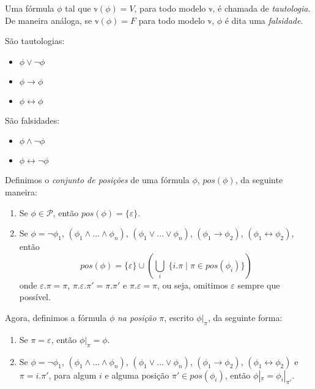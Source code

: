 \begin{definition}
    Uma fórmula $\phi$ tal que $\mathbb{v}(\phi) = V$, para todo modelo $\mathbb{v}$, é chamada de \emph{tautologia}. De maneira análoga, se $\mathbb{v}(\phi) = F$ para todo modelo $\mathbb{v}$, $\phi$ é dita uma \emph{falsidade}.
\end{definition}

\begin{example}
    São tautologias:
    \begin{itemize}
        \item $\phi \vee \neg \phi$
        \item $\phi \rightarrow \phi$
        \item $\phi \leftrightarrow \phi$
    \end{itemize}
    São falsidades:
    \begin{itemize}
        \item $\phi \wedge \neg \phi$
        \item $\phi \leftrightarrow \neg \phi$
    \end{itemize}
\end{example}

\begin{definition}
    Definimos o \emph{conjunto de posições} de uma fórmula $\phi$, $pos(\phi)$, da seguinte maneira:
    \begin{enumerate}
        \item Se $\phi \in \mathcal{P}$, então $pos(\phi) = \{\varepsilon\}$.
        \item Se $\phi = \neg \phi_1$, $(\phi_1 \wedge ... \wedge \phi_n)$, $(\phi_1 \vee ... \vee \phi_n)$, $(\phi_1 \rightarrow \phi_2)$, $(\phi_1 \leftrightarrow \phi_2)$, então $$pos(\phi) = \{\varepsilon\} \cup \left(\bigcup_i \; \{i.\pi \mid \pi \in pos(\phi_i)\}\right)$$ onde $\varepsilon.\pi = \pi$, $\pi.\varepsilon.\pi' = \pi.\pi'$ e $\pi.\varepsilon = \pi$, ou seja, omitimos $\varepsilon$ sempre que possível.
    \end{enumerate}
    Agora, definimos a fórmula $\phi$ \emph{na posição} $\pi$, escrito $\phi|_\pi$, da seguinte forma:
    \begin{enumerate}
        \item Se $\pi = \varepsilon$, então $\phi|_\pi = \phi$.
        \item Se $\phi = \neg \phi_1$, $(\phi_1 \wedge ... \wedge \phi_n)$, $(\phi_1 \vee ... \vee \phi_n)$, $(\phi_1 \rightarrow \phi_2)$, $(\phi_1 \leftrightarrow \phi_2)$ e $\pi = i.\pi'$, para algum $i$ e alguma posição $\pi' \in pos(\phi_i)$, então $\phi|_\pi = \phi_i|_{\pi'}$.
    \end{enumerate}
\end{definition}

